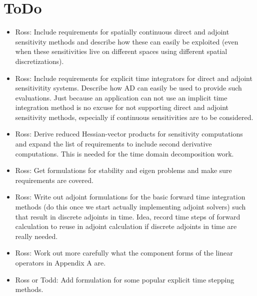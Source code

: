 \documentclass[pdf,ps2pdf,11pt]{SANDreport}
\begin{document}
\section{ToDo}

\begin{itemize}
%
{}\item Ross: Include requirements for spatially continuous direct and adjoint
sensitivity methods and describe how these can easily be exploited (even when
these sensitivities live on different spaces using different spatial
discretizations).
%
{}\item Ross: Include requirements for explicit time integrators for direct
and adjoint sensitivitity systems.  Describe how AD can easily be used to
provide such evaluations.  Just because an application can not use an implicit
time integration method is no excuse for not supporting direct and adjoint
sensitivity methods, especially if continuous sensitivities are to be
considered.
%
{}\item Ross: Derive reduced Hessian-vector products for sensitivity
computations and expand the list of requirements to include second derivative
computations.  This is needed for the time domain decomposition work.
%
{}\item Ross: Get formulations for stability and eigen problems and make sure
requirements are covered.
%
{}\item Ross: Write out adjoint formulations for the basic forward
time integration methods (do this once we start actually implementing
adjoint solvers) such that result in discrete adjoints in time.  Idea,
record time steps of forward calculation to reuse in adjoint
calculation if discrete adjoints in time are really needed.
%
{}\item Ross: Work out more carefully what the component forms of the
linear operators in Appendix A are.
%
%
{}\item Ross or Todd: Add formulation for some popular explicit time stepping
methods.
%

\end{itemize}
\end{document}
